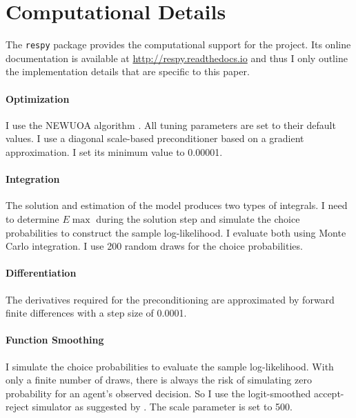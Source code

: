 \section{Computational Details}\label{Computational Details}
The \verb+respy+ package \citep{respy-1.0} provides the computational support for the project. Its online documentation is available at \url{http://respy.readthedocs.io} and thus I only outline the implementation details that are specific to this paper.

\paragraph{Optimization} I use the NEWUOA algorithm \citep{Powell.2006}. All tuning parameters are set to their default values. I use a diagonal scale-based preconditioner based on a gradient approximation. I set its minimum value to 0.00001.

\paragraph{Integration} The solution and estimation of the model produces two types of integrals. I need to determine $E\max$ during the solution step and simulate the choice probabilities to construct the sample log-likelihood. I evaluate both using Monte Carlo integration. I use 200 random draws for the choice probabilities.

\paragraph{Differentiation} The derivatives required for the preconditioning are approximated by forward finite differences with a step size of 0.0001.

\paragraph{Function Smoothing} I simulate the choice probabilities to evaluate the sample log-likelihood. With only a finite number of draws, there is always the risk of simulating zero probability for an agent's observed decision. So I use the logit-smoothed accept-reject simulator as suggested by \citet{McFadden.1989}. The scale parameter is set to 500.

